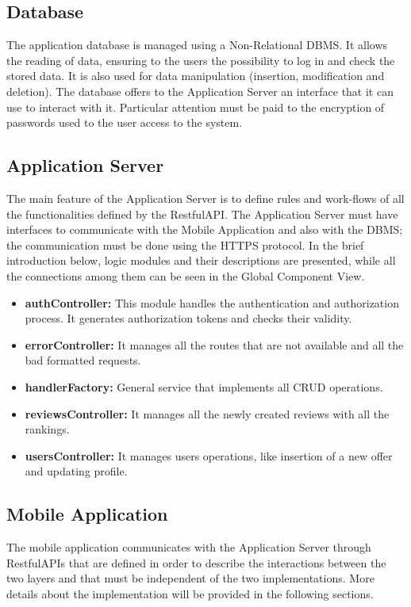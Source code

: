 \documentclass[../../dd.tex]{subfiles}
\begin{document}
    
    \subsection{Database}
    The application database is managed using a Non-Relational DBMS.
    It allows the reading of data, ensuring to the users the possibility to log in and check the stored data.
    It is also used for data manipulation (insertion, modification and deletion).
    The database offers to the Application Server an interface that it can use
    to interact with it.
    Particular attention must be paid to the encryption of passwords used to the user access to the system.

    \subsection{Application Server}
    The main feature of the Application Server is to define rules and work-flows
    of all the functionalities defined by the RestfulAPI.
    The Application Server must have interfaces to communicate with the Mobile
    Application and also with the DBMS; the communication must be done using
    the HTTPS protocol.
    In the brief introduction below, logic modules and their descriptions are
    presented, while all the connections among them can be seen in the Global
    Component View.
    \begin{itemize}
        \item \textbf{authController:} This module handles the authentication and authorization process.
        It generates authorization tokens and checks their validity.
        \item \textbf{errorController:} It manages all the routes that are not available and all the bad formatted requests.
        \item \textbf{handlerFactory:} General service that implements all CRUD operations.
        \item \textbf{reviewsController:} It manages all the newly created reviews with all the rankings.
        \item \textbf{usersController:} It manages users operations, like insertion of a new offer and updating profile.
    \end{itemize}

    \subsection{Mobile Application}
    The mobile application communicates with the Application Server
    through RestfulAPIs that are defined in order to describe the interactions
    between the two layers and that must be independent of the two implementations. More details about the implementation will be provided in the following sections.
    
\end{document}
